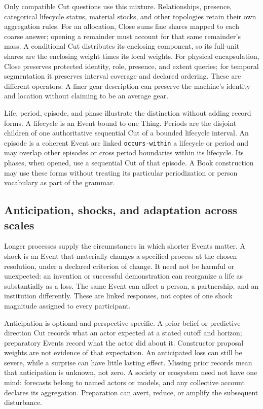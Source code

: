 \documentclass[11pt,a4paper]{article}
\begin{document}
Only compatible Cut questions use this mixture. Relationships, presence,
categorical lifecycle status, material stocks, and other topologies retain their
own aggregation rules. For an allocation, Close sums fine shares mapped to each
coarse answer; opening a remainder must account for that same remainder's mass.
A conditional Cut distributes its enclosing component, so its full-unit shares
are the enclosing weight times its local weights. For physical encapsulation,
Close preserves protected identity, role, presence, and extent queries; for
temporal segmentation it preserves interval coverage and declared ordering.
These are different operators. A finer gear description can preserve the
machine's identity and location without claiming to be an average gear.

Life, period, episode, and phase illustrate the distinction without adding
record forms. A lifecycle is an Event bound to one Thing. Periods are the
disjoint children of one authoritative sequential Cut of a bounded lifecycle
interval. An episode is a coherent Event arc linked \texttt{occurs-within} a
lifecycle or period and may overlap other episodes or cross period boundaries
within its lifecycle. Its phases, when opened, use a sequential Cut of that
episode. A Book construction may use these forms
without treating its particular periodization or person vocabulary as part of
the grammar.

\subsection{Anticipation, shocks, and adaptation across scales}
\label{sec:multiscale-change}

Longer processes supply the circumstances in which shorter Events matter.
A shock is an Event that materially changes a specified process at the chosen
resolution, under a declared criterion of change. It need not be harmful or
unexpected: an invention or successful demonstration can reorganize a life as
substantially as a loss. The same Event can affect a person, a partnership,
and an institution differently. These are linked responses, not copies of one
shock magnitude assigned to every participant.

Anticipation is optional and perspective-specific. A prior belief or predictive
direction Cut records what an actor expected at a stated cutoff and horizon;
preparatory Events record what the actor did about it. Constructor proposal
weights are not evidence of that expectation. An anticipated loss can still
be severe, while a surprise can have little lasting effect. Missing prior
records mean that anticipation is unknown, not zero. A society or ecosystem
need not have one mind: forecasts belong to named actors or models, and any
collective account declares its aggregation. Preparation can avert, reduce,
or amplify the subsequent disturbance.
\end{document}
